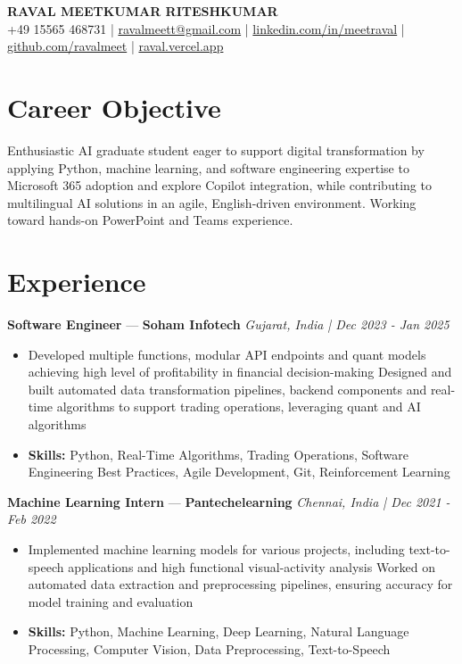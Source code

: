 \documentclass[a4paper,10pt]{article}
\begin{document}
\begin{center}
  {\Large\bfseries RAVAL MEETKUMAR RITESHKUMAR}\\[2pt]
  {\small +49 15565 468731 \;|\; \href{mailto:ravalmeett@gmail.com}{ravalmeett@gmail.com} \;|\; \href{https://www.linkedin.com/in/meetraval/}{linkedin.com/in/meetraval} \;|\; \href{https://github.com/ravalmeet}{github.com/ravalmeet} \;|\; \href{https://raval.vercel.app/}{raval.vercel.app}}
\end{center}
\vspace{-3pt}

\section*{Career Objective}
Enthusiastic AI graduate student eager to support digital transformation by applying Python, machine learning, and software engineering expertise to Microsoft 365 adoption and explore Copilot integration, while contributing to multilingual AI solutions in an agile, English-driven environment. Working toward hands-on PowerPoint and Teams experience.\par

\section*{Experience}
\textbf{Software Engineer} — \textbf{Soham Infotech} \hfill \textit{Gujarat, India \;|\; Dec 2023 - Jan 2025}\par
\vspace{1pt}
\begin{itemize}
  \item Developed multiple functions, modular API endpoints and quant models achieving high level of profitability in financial decision-making Designed and built automated data transformation pipelines, backend components and real-time algorithms to support trading operations, leveraging quant and AI algorithms
  \item \textbf{Skills:} Python, Real-Time Algorithms, Trading Operations, Software Engineering Best Practices, Agile Development, Git, Reinforcement Learning
\end{itemize}
\vspace{3pt}
\textbf{Machine Learning Intern} — \textbf{Pantechelearning} \hfill \textit{Chennai, India \;|\; Dec 2021 - Feb 2022}\par
\vspace{1pt}
\begin{itemize}
  \item Implemented machine learning models for various projects, including text-to-speech applications and high functional visual-activity analysis Worked on automated data extraction and preprocessing pipelines, ensuring accuracy for model training and evaluation
  \item \textbf{Skills:} Python, Machine Learning, Deep Learning, Natural Language Processing, Computer Vision, Data Preprocessing, Text-to-Speech
\end{itemize}
\end{document}
